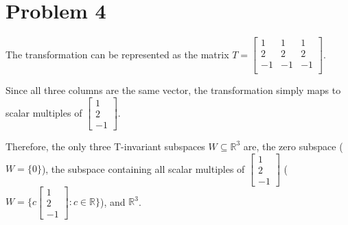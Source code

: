 \section{Problem 4}

The transformation can be represented as the matrix
$T =
\begin{bmatrix} 
    1 & 1 & 1 \\
    2 & 2 & 2 \\
    -1 & -1 & -1 \\
\end{bmatrix}$. \gap 

Since all three columns are the same vector, 
the transformation simply maps to scalar multiples of 
$\begin{bmatrix} 1 \\ 2 \\ -1 \end{bmatrix}$.

Therefore, the only three T-invariant subspaces $W \subseteq \mathbb{R}^3$ are,
the zero subspace ($W = \{0\}$),
the subspace containing all scalar multiples of 
$\begin{bmatrix} 1 \\ 2 \\ -1 \end{bmatrix}$
($W = \{c\begin{bmatrix} 1 \\ 2 \\ -1 \end{bmatrix} : c \in \mathbb{R}\}$),
and $\mathbb{R}^3$.
